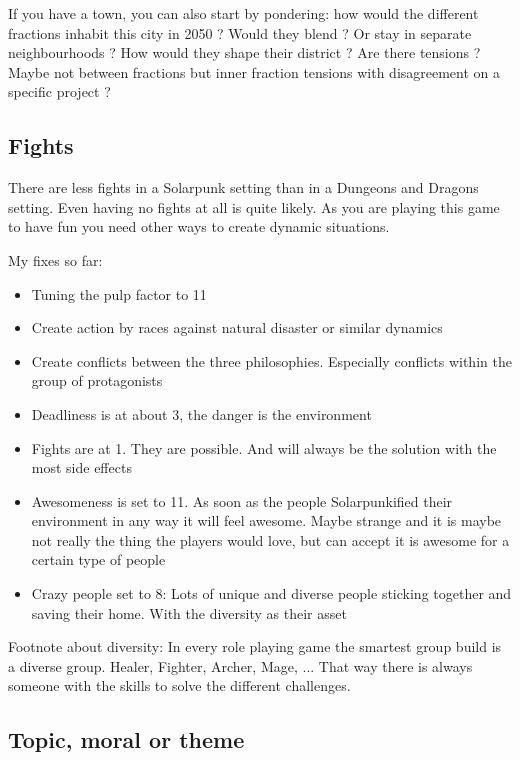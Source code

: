If you have a town, you can also start by pondering: how would the different fractions inhabit this city in 2050 ? Would they blend ? Or stay in separate neighbourhoods ? How would they shape their district ?
Are there tensions ? Maybe not between fractions but inner fraction tensions with disagreement on a specific project ?

\subsection{Fights}

There are less fights in a Solarpunk setting than in a Dungeons and Dragons setting. Even having no fights at all is quite likely. As you are playing this game to have fun you need other ways to create dynamic situations.

My fixes so far:
\begin{itemize}
    \item{Tuning the pulp factor to 11}
    \item {Create action by races against natural disaster or similar dynamics}
    \item{Create conflicts between the three philosophies. Especially conflicts within the group of protagonists}
    \item {Deadliness is at about 3, the danger is the environment}
    \item {Fights are at 1. They are possible. And will always be the solution with the most side effects}
    \item {Awesomeness is set to 11. As soon as the people Solarpunkified their environment in any way it will feel awesome. Maybe strange and it is maybe not really the thing the players would love, but can accept it is awesome for a certain type of people}
    \item {Crazy people set to 8: Lots of unique and diverse people sticking together and saving their home. With the diversity as their asset}
\end{itemize}

Footnote about diversity: In every role playing game the smartest group build is a diverse group. Healer, Fighter, Archer, Mage, ... That way there is always someone with the skills to solve the different challenges.

\subsection{Topic, moral or theme}

